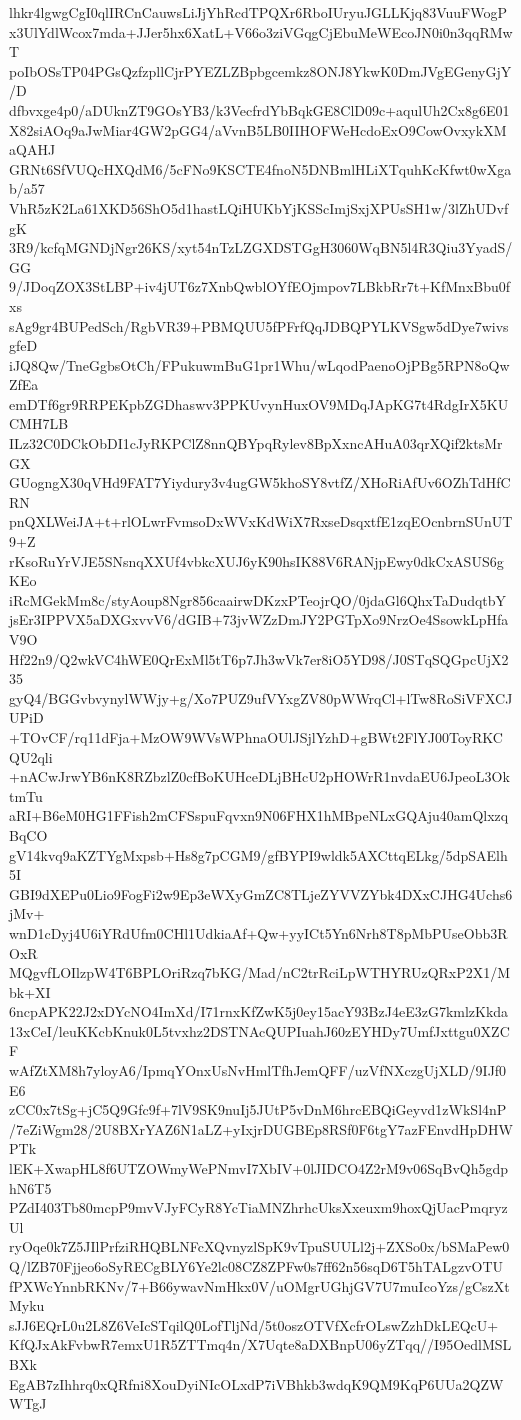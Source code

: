 lhkr4lgwgCgI0qlIRCnCauwsLiJjYhRcdTPQXr6RboIUryuJGLLKjq83VuuFWogP
x3UlYdlWcox7mda+JJer5hx6XatL+V66o3ziVGqgCjEbuMeWEcoJN0i0n3qqRMwT
poIbOSsTP04PGsQzfzpllCjrPYEZLZBpbgcemkz8ONJ8YkwK0DmJVgEGenyGjY/D
dfbvxge4p0/aDUknZT9GOsYB3/k3VecfrdYbBqkGE8ClD09c+aqulUh2Cx8g6E01
X82siAOq9aJwMiar4GW2pGG4/aVvnB5LB0IIHOFWeHcdoExO9CowOvxykXMaQAHJ
GRNt6SfVUQcHXQdM6/5cFNo9KSCTE4fnoN5DNBmlHLiXTquhKcKfwt0wXgab/a57
VhR5zK2La61XKD56ShO5d1hastLQiHUKbYjKSScImjSxjXPUsSH1w/3lZhUDvfgK
3R9/kcfqMGNDjNgr26KS/xyt54nTzLZGXDSTGgH3060WqBN5l4R3Qiu3YyadS/GG
9/JDoqZOX3StLBP+iv4jUT6z7XnbQwblOYfEOjmpov7LBkbRr7t+KfMnxBbu0fxs
sAg9gr4BUPedSch/RgbVR39+PBMQUU5fPFrfQqJDBQPYLKVSgw5dDye7wivsgfeD
iJQ8Qw/TneGgbsOtCh/FPukuwmBuG1pr1Whu/wLqodPaenoOjPBg5RPN8oQwZfEa
emDTf6gr9RRPEKpbZGDhaswv3PPKUvynHuxOV9MDqJApKG7t4RdgIrX5KUCMH7LB
ILz32C0DCkObDI1cJyRKPClZ8nnQBYpqRylev8BpXxncAHuA03qrXQif2ktsMrGX
GUogngX30qVHd9FAT7Yiydury3v4ugGW5khoSY8vtfZ/XHoRiAfUv6OZhTdHfCRN
pnQXLWeiJA+t+rlOLwrFvmsoDxWVxKdWiX7RxseDsqxtfE1zqEOcnbrnSUnUT9+Z
rKsoRuYrVJE5SNsnqXXUf4vbkcXUJ6yK90hsIK88V6RANjpEwy0dkCxASUS6gKEo
iRcMGekMm8c/styAoup8Ngr856caairwDKzxPTeojrQO/0jdaGl6QhxTaDudqtbY
jsEr3IPPVX5aDXGxvvV6/dGIB+73jvWZzDmJY2PGTpXo9NrzOe4SsowkLpHfaV9O
Hf22n9/Q2wkVC4hWE0QrExMl5tT6p7Jh3wVk7er8iO5YD98/J0STqSQGpcUjX235
gyQ4/BGGvbvynylWWjy+g/Xo7PUZ9ufVYxgZV80pWWrqCl+lTw8RoSiVFXCJUPiD
+TOvCF/rq11dFja+MzOW9WVsWPhnaOUlJSjlYzhD+gBWt2FlYJ00ToyRKCQU2qli
+nACwJrwYB6nK8RZbzlZ0cfBoKUHceDLjBHcU2pHOWrR1nvdaEU6JpeoL3OktmTu
aRI+B6eM0HG1FFish2mCFSspuFqvxn9N06FHX1hMBpeNLxGQAju40amQlxzqBqCO
gV14kvq9aKZTYgMxpsb+Hs8g7pCGM9/gfBYPI9wldk5AXCttqELkg/5dpSAElh5I
GBI9dXEPu0Lio9FogFi2w9Ep3eWXyGmZC8TLjeZYVVZYbk4DXxCJHG4Uchs6jMv+
wnD1cDyj4U6iYRdUfm0CHl1UdkiaAf+Qw+yyICt5Yn6Nrh8T8pMbPUseObb3ROxR
MQgvfLOIlzpW4T6BPLOriRzq7bKG/Mad/nC2trRciLpWTHYRUzQRxP2X1/Mbk+XI
6ncpAPK22J2xDYcNO4ImXd/I71rnxKfZwK5j0ey15acY93BzJ4eE3zG7kmlzKkda
13xCeI/leuKKcbKnuk0L5tvxhz2DSTNAcQUPIuahJ60zEYHDy7UmfJxttgu0XZCF
wAfZtXM8h7yloyA6/IpmqYOnxUsNvHmlTfhJemQFF/uzVfNXczgUjXLD/9IJf0E6
zCC0x7tSg+jC5Q9Gfc9f+7lV9SK9nuIj5JUtP5vDnM6hrcEBQiGeyvd1zWkSl4nP
/7eZiWgm28/2U8BXrYAZ6N1aLZ+yIxjrDUGBEp8RSf0F6tgY7azFEnvdHpDHWPTk
lEK+XwapHL8f6UTZOWmyWePNmvI7XbIV+0lJIDCO4Z2rM9v06SqBvQh5gdphN6T5
PZdI403Tb80mcpP9mvVJyFCyR8YcTiaMNZhrhcUksXxeuxm9hoxQjUacPmqryzUl
ryOqe0k7Z5JIlPrfziRHQBLNFcXQvnyzlSpK9vTpuSUULl2j+ZXSo0x/bSMaPew0
Q/lZB70Fjjeo6oSyRECgBLY6Ye2lc08CZ8ZPFw0s7ff62n56sqD6T5hTALgzvOTU
fPXWcYnnbRKNv/7+B66ywavNmHkx0V/uOMgrUGhjGV7U7muIcoYzs/gCszXtMyku
sJJ6EQrL0u2L8Z6VeIcSTqilQ0LofTljNd/5t0oszOTVfXcfrOLswZzhDkLEQcU+
KfQJxAkFvbwR7emxU1R5ZTTmq4n/X7Uqte8aDXBnpU06yZTqq//I95OedlMSLBXk
EgAB7zIhhrq0xQRfni8XouDyiNIcOLxdP7iVBhkb3wdqK9QM9KqP6UUa2QZWWTgJ
